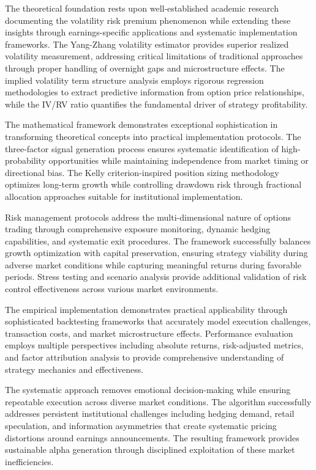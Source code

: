 \documentclass[
  american,
  11pt,
  11pt,
  letterpaper,
  onecolumn]{article}
\begin{document}
The theoretical foundation rests upon well-established academic research
documenting the volatility risk premium phenomenon while extending these
insights through earnings-specific applications and systematic
implementation frameworks. The Yang-Zhang volatility estimator provides
superior realized volatility measurement, addressing critical
limitations of traditional approaches through proper handling of
overnight gaps and microstructure effects. The implied volatility term
structure analysis employs rigorous regression methodologies to extract
predictive information from option price relationships, while the IV/RV
ratio quantifies the fundamental driver of strategy profitability.

The mathematical framework demonstrates exceptional sophistication in
transforming theoretical concepts into practical implementation
protocols. The three-factor signal generation process ensures systematic
identification of high-probability opportunities while maintaining
independence from market timing or directional bias. The Kelly
criterion-inspired position sizing methodology optimizes long-term
growth while controlling drawdown risk through fractional allocation
approaches suitable for institutional implementation.

Risk management protocols address the multi-dimensional nature of
options trading through comprehensive exposure monitoring, dynamic
hedging capabilities, and systematic exit procedures. The framework
successfully balances growth optimization with capital preservation,
ensuring strategy viability during adverse market conditions while
capturing meaningful returns during favorable periods. Stress testing
and scenario analysis provide additional validation of risk control
effectiveness across various market environments.

The empirical implementation demonstrates practical applicability
through sophisticated backtesting frameworks that accurately model
execution challenges, transaction costs, and market microstructure
effects. Performance evaluation employs multiple perspectives including
absolute returns, risk-adjusted metrics, and factor attribution analysis
to provide comprehensive understanding of strategy mechanics and
effectiveness.

The systematic approach removes emotional decision-making while ensuring
repeatable execution across diverse market conditions. The algorithm
successfully addresses persistent institutional challenges including
hedging demand, retail speculation, and information asymmetries that
create systematic pricing distortions around earnings announcements. The
resulting framework provides sustainable alpha generation through
disciplined exploitation of these market inefficiencies.
\end{document}

